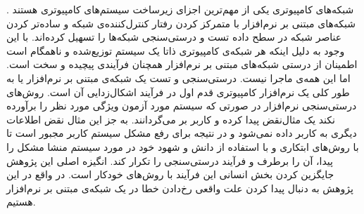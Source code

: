 شبکه‌های کامپیوتری یکی از مهم‌ترین اجزای زیرساخت سیستم‌های کامپیوتری هستند
\cite{foerster2018survey}.
شبکه‌های مبتنی بر نرم‌افزار
با متمرکز کردن رفتار کنترل‌کننده‌ی شبکه و ساده‌تر کردن عناصر شبکه در سطح داده
تست و درستی‌سنجی شبکه‌ها را تسهیل کرده‌اند.
با این وجود به دلیل اینکه هر شبکه‌‌ی کامپیوتری ذاتا یک سیستم توزیع‌شده و  ناهمگام
است
اطمینان از درستی شبکه‌های مبتنی بر نرم‌افزار همچنان فرآیندی پیچیده و سخت است.
اما این همه‌ی ماجرا نیست.
درستی‌سنجی
و تست یک شبکه‌ی مبتنی بر نرم‌افزار یا به طور کلی یک نرم‌افزار کامپیوتری قدم اول در فرآیند اشکال‌زدایی
آن است.
روش‌های درستی‌سنجی نرم‌افزار در صورتی که سیستم مورد آزمون ویژگی
مورد نظر را برآورده نکند یک مثال‌نقض
پیدا کرده و کاربر بر می‌گردانند.
به جز این مثال نقض اطلاعات دیگری به کاربر داده نمی‌شود و در نتیجه برای رفع مشکل سیستم کاربر مجبور است تا با روش‌های ابتکاری و با استفاده از دانش و شهود خود در مورد سیستم منشا مشکل را پیدا، آن را برطرف و فرآیند درستی‌سنجی را تکرار کند.
انگیزه اصلی این پژوهش جایگزین کردن بخش انسانی این فرآیند با روش‌های خودکار است.
در واقع در این پژوهش به دنبال پیدا کردن علت واقعی رخ‌دادن خطا در یک شبکه‌ی مبتنی بر نرم‌افزار هستیم.
\begin{figure}
    \centering
    \caption{ }
    \label{fig:blacklist:consistent}
\end{figure}

